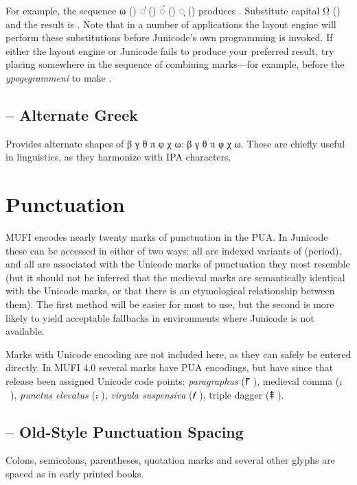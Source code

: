 For example, the sequence ω () ◌̓ () ◌́ () ◌ͅ ()
produces .
Substitute capital Ω () and the result is
. Note that in a number of applications the layout
engine will perform these substitutions before Junicode’s own programming is
invoked. If either the layout engine or Junicode fails to produce your
preferred result, try placing   somewhere
in the sequence of combining marks---for example, before the \textit{ypogegrammeni}
to make .

\subsection{ -- Alternate Greek}
Provides alternate shapes of {β γ θ π φ χ ω}:
{β γ θ π φ χ ω}.
These are chiefly useful in linguistics, as they harmonize with IPA characters.

\section{Punctuation}
MUFI encodes nearly twenty marks of punctuation in the PUA. In Junicode these can be accessed in
either of two ways: all are indexed variants of  (period), and all are associated with the Unicode marks of
punctuation they most resemble (but it should not be inferred that the medieval marks are semantically identical with
the Unicode marks, or that there is an etymological relationship between them). The first method will be easier for
most to use, but the second is more likely to yield acceptable fallbacks in environments where Junicode is not
available.

Marks with Unicode encoding are not included here, as they can safely be entered directly. In MUFI 4.0 several marks
have PUA encodings, but have since that release been assigned Unicode code points: \textit{paragraphus} (⹍
), medieval comma (⹌~), \textit{punctus elevatus} (⹎ ), \textit{virgula suspensiva}
(⹊ ), triple dagger (⹋ ).

\subsection{ -- Old-Style Punctuation Spacing}
Colons, semicolons, parentheses, quotation marks and several other glyphs are spaced as in early printed books.

